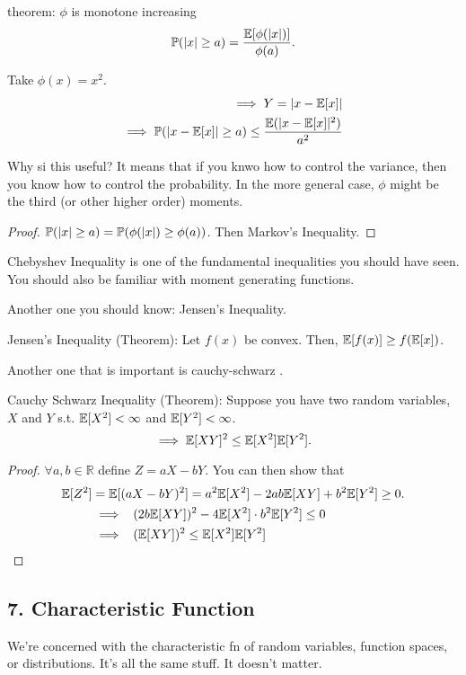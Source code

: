 theorem:
$\phi$ is monotone increasing
\[ \mathbb{P}(|x| \geq a)  = \frac{\mathbb{E}[ \phi(|x|)]}{ \phi(a)}.\]

Take $\phi(x) = x^2$.
\[
\begin{aligned}
\implies Y = |x - \mathbb{E}[x]| \\
\implies \mathbb{P}(|x - \mathbb{E}[x]| \geq a) \leq \frac{ \mathbb{E}(|x - \mathbb{E}[x]|^2) }{ a^2 }
\end{aligned}
\]


Why si this useful? It means that if you knwo how to control the variance, then you know how to control the probability. In the more general case, $\phi$ might be the third (or other higher order) moments.

\begin{proof}
$\mathbb{P}(|x| \geq a) = \mathbb{P}( \phi(|x|) \geq \phi(a) )$. Then Markov's Inequality.
\end{proof}


Chebyshev Inequality is one of the fundamental inequalities you should have seen. You should also be familiar with moment generating functions.

Another one you should know: Jensen's Inequality.

Jensen's Inequality (Theorem): Let $f(x)$ be convex. Then, $\mathbb{E}[f(x)] \geq f(\mathbb{E}[x])$.

Another one that is important is cauchy-schwarz .

Cauchy Schwarz Inequality (Theorem): Suppose you have two random variables, $X$ and $Y$ s.t. $\mathbb{E}[X^2] < \infty$ and $\mathbb{E}[Y^2] < \infty$.
\[ \implies \mathbb{E}[XY]^2 \leq \mathbb{E}[X^2] \mathbb{E}[Y^2]. \]

\begin{proof}
$\forall a, b \in \mathbb{R}$ define $Z = aX - bY$. You can then show that
\[\begin{aligned}
\mathbb{E}[Z^2] &= \mathbb{E}[(aX - bY)^2] = a^2 \mathbb{E}[X^2] - 2ab \mathbb{E}[XY] + b^2 \mathbb{E}[Y^2] \geq 0 . \\
&\implies \;\; (2b \mathbb{E}[XY])^2 - 4 \mathbb{E}[X^2] \cdot b^2 \mathbb{E}[Y^2] \leq 0 \\
&\implies \;\; (\mathbb{E}[XY])^2 \leq \mathbb{E}[X^2] \mathbb{E}[Y^2]
\end{aligned}\]
\end{proof}


\subsection*{7. Characteristic Function}
We're concerned with the characteristic fn of random variables, function spaces, or distributions. It's all the same stuff. It doesn't matter.

